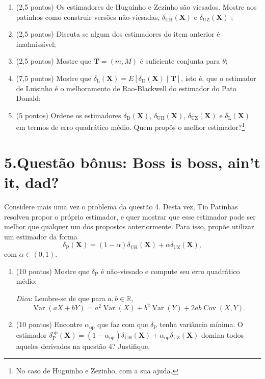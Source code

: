 \documentclass[a4paper,10pt, notitlepage]{report}
\newcommand{\vr}{\operatorname{Var}} %
\newcommand{\bX}{\boldsymbol{X}} %
\begin{document}
\begin{enumerate}[label=\alph*)]
 \item (2,5 pontos) Os estimadores de Huguinho e Zezinho são viesados.
 Mostre aos patinhos como construir versões não-viesadas, $\delta_{\text{UH}}(\bX)$ e $\delta_{\text{UZ}}(\bX)$ ;
 \item (2,5  pontos) Discuta se algum dos estimadores do item anterior é inadmissível;
 \item (2,5  pontos) Mostre que $\boldsymbol{T} = (m, M)$ é suficiente conjunta para $\theta$;  
 \item (7,5 pontos) Mostre que $\delta_{\text{L}}(\bX) = E\left[\delta_{\text{D}}(\bX) \mid \boldsymbol{T}\right]$, isto é, que o estimador de Luisinho é o melhoramento de Rao-Blackwell do estimador do Pato Donald;
 \item (5 pontos) Ordene os estimadores $\delta_{\text{D}}(\bX)$, $\delta_{\text{UH}}(\bX)$, $\delta_{\text{UZ}}(\bX)$ e $\delta_{\text{L}}(\bX)$ em termos de erro quadrático médio.
 Quem propôs o melhor estimador?\footnote{No caso de Huguinho e Zezinho, com a sua ajuda.} 
\end{enumerate}

\newpage
\section*{5.Questão bônus: Boss is boss, ain't it, dad?}

Considere mais uma vez o problema da questão 4.
Desta vez, Tio Patinhas resolveu propor o próprio estimador, e quer mostrar que esse estimador pode ser melhor que qualquer um dos propostos 
anteriormente.
Para isso, propõe utilizar um estimador da forma
$$
\delta_{\text{P}}(\bX) = (1-\alpha) \delta_{\text{UH}}(\bX) + \alpha \delta_{\text{UZ}}(\bX),
$$
com $\alpha \in (0, 1)$.
\begin{enumerate}[label=\alph*)]
 \item (10 pontos) Mostre que $\delta_{\text{P}}$ é não-viesado e compute seu erro quadrático médio;
 
 \textit{Dica}: Lembre-se de que para $a,b \in \mathbb{R}$,
 $$\vr\left(aX + bY\right) = a^2\vr(X) + b^2\vr(Y) + 2ab\operatorname{Cov}(X, Y).$$
 \item (10 pontos) Encontre $\alpha_{\text{op}}$ que faz com que $\delta_{\text{P}}$ tenha variância mínima.
 O estimador $\delta_{\text{P}}^{\text{op}}(\bX) = (1-\alpha_{\text{op}}) \delta_{\text{UH}}(\bX) + \alpha_{\text{op}} \delta_{\text{UZ}}(\bX)$ domina todos aqueles derivados na questão 4? Justifique.
\end{enumerate}



\end{document}
